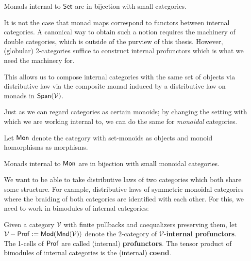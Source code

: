 \begin{lemma}
\label{lem:internalcat}

Monads internal to $\mathsf{Set}$ are in bijection with small categories.
\end{lemma}


It is not the case that monad maps correspond to functors between internal categories.  A canonical way to obtain such a notion requires the machinery of double categories, which is outside of the purview of this thesis.  However, (globular) 2-categories suffice to construct internal profunctors which is what we need the machinery for.


This allows us to compose internal categories with the same set of objects via distributive law via the composite monad induced by a distributive law on monads in $\mathsf{Span}(\mathcal{V})$.


Just as we can regard categories as certain monoids; by changing the setting with which we are working internal to, we can do the same for {\em monoidal} categories.

\begin{definition}
\label{def:monoid}
Let ${\sf Mon}$ denote the category with set-monoids as objects and monoid homorphisms as morphisms.
\end{definition}



\begin{lemma}
\label{def:internalmonoidalcat}

Monads internal to ${\sf Mon}$ are in bijection with small monoidal categories.
\end{lemma}

We want to be able to take distributive laws of two categories which both share some structure.  For example, distributive laws of symmetric monoidal categories where the braiding of both categories are identified with each other.  For this, we need to work in bimodules of internal categories:

\begin{definition}
Given a category $\mathcal V$ with finite pullbacks and coequalizers preserving them, let $\mathcal V-{\sf Prof}:={\sf Mod}({\sf Mnd}(\mathcal V))$ denote the 2-category of $\mathcal V$-{\bf internal profunctors}.  
The 1-cells of ${\sf Prof}$ are called (internal) {\bf  profunctors}.
The tensor product of bimodules of internal categories is the (internal) {\bf coend}.
\end{definition}




